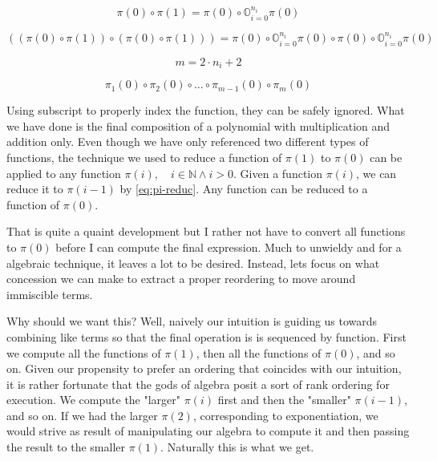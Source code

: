 \documentclass[12pt]{article}
\begin{document}
\begin{equation}
    \pi(0) \circ \pi(1) = \pi(0) \circ \mathbb{O}_{i=0}^{n_i} \pi(0)
\end{equation}

\begin{equation}
    ((\pi(0) \circ \pi(1)) \circ (\pi(0) \circ \pi(1)))  = \pi(0) \circ \mathbb{O}_{i=0}^{n_i} \pi(0) \circ \pi(0) \circ \mathbb{O}_{i=0}^{n_i} \pi(0)
\end{equation}

\begin{equation}
    m = 2 \cdot n_i + 2
\end{equation}

\begin{equation}
    \pi_1(0) \circ \pi_2(0) \circ \dots \circ \pi_{m-1}(0) \circ \pi_m(0)
\end{equation}

Using subscript to properly index the function, they can be safely ignored.
What we have done is the final composition of a polynomial with multiplication
and addition only. Even though we have only referenced two different types of
functions, the technique we used to reduce a function of $\pi(1)$ to $\pi(0)$
can be applied to any function $\pi(i), \quad i \in \mathbb{N} \land i > 0$.
Given a function $\pi(i)$, we can reduce it to $\pi(i-1)$ by \ref{eq:pi-reduc}.
Any function can be reduced to a function of $\pi(0)$.

That is quite a quaint development but I rather not have to convert all
functions to $\pi(0)$ before I can compute the final expression. Much to
unwieldy and for a algebraic technique, it leaves a lot to be desired. Instead,
lets focus on what concession we can make to extract a proper reordering to
move around immiscible terms.

Why should we want this? Well, naively our intuition is guiding us towards
combining like terms so that the final operation is is sequenced by function.
First we compute all the functions of $\pi(1)$, then all the functions of
$\pi(0)$, and so on. Given our propensity to prefer an ordering that coincides
with our intuition, it is rather fortunate that the gods of algebra posit a
sort of rank ordering for execution. We compute the "larger" $\pi(i)$ first and
then the "smaller" $\pi(i-1)$, and so on. If we had the larger $\pi(2)$,
corresponding to exponentiation, we would strive as result of manipulating our
algebra to compute it and then passing the result to the smaller $\pi(1)$.
Naturally this is what we get.
\end{document}
